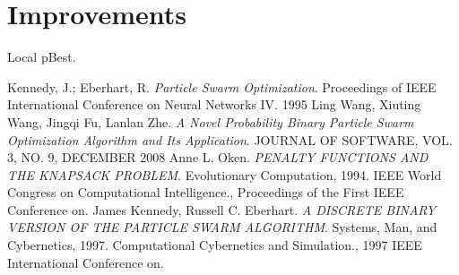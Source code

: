 \documentclass{article}
\begin{document}
\section{Improvements}
\label{lbl-impr}
Local pBest.

\newpage

\begin{thebibliography}{99}
		Kennedy, J.; Eberhart, R.
		\emph{Particle Swarm Optimization}.
		Proceedings of IEEE International Conference on Neural Networks IV.
		1995
		Ling Wang, Xiuting Wang, Jingqi Fu, Lanlan Zhe.
	  	\emph{A Novel Probability Binary Particle Swarm Optimization Algorithm and Its Application}.
	  	JOURNAL OF SOFTWARE, VOL. 3, NO. 9, DECEMBER 2008
		Anne L. Oken.
		\emph{PENALTY FUNCTIONS AND THE KNAPSACK PROBLEM}.
		Evolutionary Computation, 1994. IEEE World Congress on Computational Intelligence., Proceedings of the First IEEE Conference on.
		James Kennedy, Russell C. Eberhart.
		\emph{A DISCRETE BINARY VERSION OF THE PARTICLE SWARM ALGORITHM}.
		Systems, Man, and Cybernetics, 1997. Computational Cybernetics and Simulation., 1997 IEEE International Conference on.
\end{thebibliography}
\end{document}
